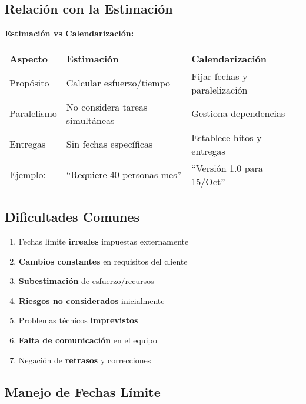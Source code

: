 \subsection{Relación con la Estimación}
\label{subsec:relacion}

\textbf{Estimación vs Calendarización:}

\begin{table}[h]
    \centering
    \begin{tabularx}{\textwidth}{|l|X|X|}
        \hline
        \textbf{Aspecto} & \textbf{Estimación}             & \textbf{Calendarización}      \\
        \hline
        Propósito        & Calcular esfuerzo/tiempo        & Fijar fechas y paralelización \\
        \hline
        Paralelismo      & No considera tareas simultáneas & Gestiona dependencias         \\
        \hline
        Entregas         & Sin fechas específicas          & Establece hitos y entregas    \\
        \hline
        Ejemplo:          & ``Requiere 40 personas-mes''    & ``Versión 1.0 para 15/Oct''   \\
        \hline
    \end{tabularx}
    \label{tab:comparacion-estimacion-calendarizacion}
\end{table}

\subsection{Dificultades Comunes}
\label{subsec:dificultades}

\begin{enumerate}
    \item Fechas límite \textbf{irreales} impuestas externamente
    \item \textbf{Cambios constantes} en requisitos del cliente
    \item \textbf{Subestimación} de esfuerzo/recursos
    \item \textbf{Riesgos no considerados} inicialmente
    \item Problemas técnicos \textbf{imprevistos}
    \item \textbf{Falta de comunicación} en el equipo
    \item Negación de \textbf{retrasos} y correcciones
\end{enumerate}

\subsection{Manejo de Fechas Límite}
\label{subsec:fechas}

